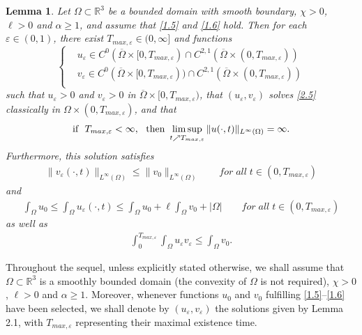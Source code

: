 \documentclass[12pt]{article}
\theoremstyle{plain}
\newtheorem{lemma}{Lemma}[section]
\theoremstyle{definition}
\numberwithin{equation}{section}
\begin{document}
\begin{lemma}\label{lemma2.1}
Let $\Omega \subset \mathbb R^3$ be a bounded domain with smooth boundary,
$\chi >0$, $\ell>0$ and   $\alpha\geq 1$, and assume that \eqref{1.5} and \eqref{1.6} hold.  Then for each $\varepsilon\in(0,1)$, there exist
$T_{max,\varepsilon}\in(0,\infty]$ and functions
\begin{equation}\label{2.6}
\left\{
\begin{aligned}
&u_{\varepsilon }\in C^0(\overline{\Omega}\times [0,T_{max,\varepsilon})\cap C^{2,1}(\overline{\Omega}\times(0,T_{max,\varepsilon})) \\
&v_{\varepsilon }\in  C^0(\overline{\Omega}\times[0,T_{max,\varepsilon}))\cap C^{2,1}(\overline{\Omega}\times(0,T_{max,\varepsilon})) \\
\end{aligned}
\right.
\end{equation}
such that $u_ \varepsilon >0$ and $v_{\varepsilon}>0$ in $\overline{\Omega} \times [0,T_{max,\varepsilon})$, that $(u_{\varepsilon
},v_{\varepsilon })$ solves \eqref{2.5} classically in $\Omega\times(0,T_{max,\varepsilon})$, and that
  \begin{equation} \label{2.7}
   \hbox{if}~~  T_{max,\varepsilon}<\infty, ~~ \hbox{then}~
   \limsup_{t\nearrow T_{max,\varepsilon}}\|u(\cdot , t)\|_{L^{\infty}(\Omega)}=\infty.
\end{equation}
Furthermore, this solution satisfies
\begin{align}\label{2.8}
    \|v_{\varepsilon}(\cdot , t)\|_{L^{\infty}(\Omega)}\leq \|v_{0 }\|_{L^{\infty}(\Omega)}\qquad for\; all\; t\in(0,T_{max,\varepsilon})
\end{align}
and
\begin{align}\label{2.9}
    \int_{\Omega}u_{0}\leq \int_{\Omega}u_{\varepsilon}(\cdot,t)\leq \int_{\Omega}u_{0}+\ell\int_{\Omega}v_{0}+|\Omega|\qquad for\;
    all\; t\in(0,T_{max,\varepsilon})
\end{align}
as well as
\begin{align}\label{2.10}
    \int_{0}^{T_{max,\varepsilon}}\int_{\Omega}u_{\varepsilon }v_{\varepsilon }\leq \int_{\Omega}v_{0}.
\end{align}
\end{lemma}

Throughout the sequel, unless explicitly stated otherwise, we shall assume  that
$\Omega\subset \mathbb R^3$  is a smoothly bounded domain (the convexity of $\Omega$ is not required),
$\chi >0$, $\ell> 0$ and   $\alpha\geq 1$. Moreover, whenever  functions  $u_0$ and $v_0$ fulfilling \eqref{1.5}--\eqref{1.6}
have been selected,  we shall  denote by $(u_{\varepsilon
},v_{\varepsilon })$  the solutions given by Lemma 2.1, with $T_{max,\varepsilon}$ representing their maximal existence time.
\end{document}
